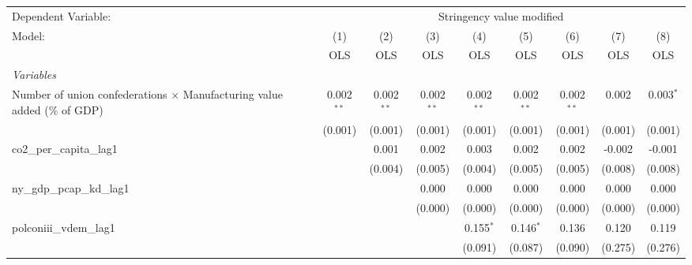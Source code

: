 
\begingroup
\centering
\begin{tabular}{lcccccccc}
   \toprule
   Dependent Variable: & \multicolumn{8}{c}{Stringency value modified}\\
   Model:                                                                          & (1)          & (2)          & (3)          & (4)          & (5)          & (6)          & (7)     & (8)\\  
                                                                                   &  OLS         & OLS          & OLS          & OLS          & OLS          & OLS          & OLS     & OLS\\  
   \midrule
   \emph{Variables}\\
   Number of union confederations $\times$ Manufacturing value added (\% of GDP)   & 0.002$^{**}$ & 0.002$^{**}$ & 0.002$^{**}$ & 0.002$^{**}$ & 0.002$^{**}$ & 0.002$^{**}$ & 0.002   & 0.003$^{*}$\\   
                                                                                   & (0.001)      & (0.001)      & (0.001)      & (0.001)      & (0.001)      & (0.001)      & (0.001) & (0.001)\\   
   co2\_per\_capita\_lag1                                                          &              & 0.001        & 0.002        & 0.003        & 0.002        & 0.002        & -0.002  & -0.001\\   
                                                                                   &              & (0.004)      & (0.005)      & (0.004)      & (0.005)      & (0.005)      & (0.008) & (0.008)\\   
   ny\_gdp\_pcap\_kd\_lag1                                                         &              &              & 0.000        & 0.000        & 0.000        & 0.000        & 0.000   & 0.000\\   
                                                                                   &              &              & (0.000)      & (0.000)      & (0.000)      & (0.000)      & (0.000) & (0.000)\\   
   polconiii\_vdem\_lag1                                                           &              &              &              & 0.155$^{*}$  & 0.146$^{*}$  & 0.136        & 0.120   & 0.119\\   
                                                                                   &              &              &              & (0.091)      & (0.087)      & (0.090)      & (0.275) & (0.276)\\   

\end{tabular}
